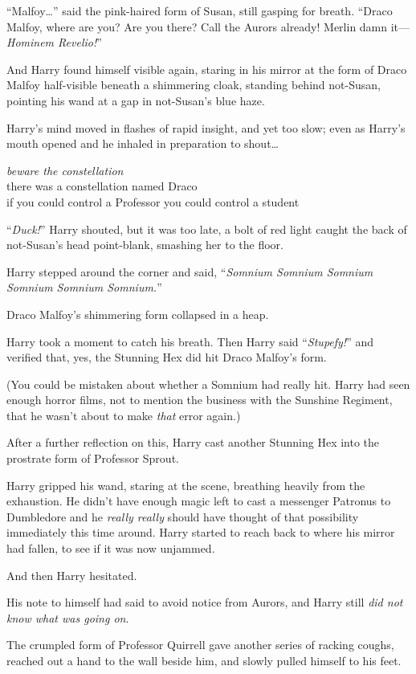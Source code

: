 “Malfoy…” said the pink-haired form of Susan, still gasping for breath. “Draco Malfoy, where are you? Are you there? Call the Aurors already! Merlin damn it—\emph{Hominem Revelio!}”

And Harry found himself visible again, staring in his mirror at the form of Draco Malfoy half-visible beneath a shimmering cloak, standing behind not-Susan, pointing his wand at a gap in not-Susan’s blue haze.

Harry’s mind moved in flashes of rapid insight, and yet too slow; even as Harry’s mouth opened and he inhaled in preparation to shout…

\noindent{}\emph{beware the constellation}\\
there was a constellation named Draco\\
if you could control a Professor you could control a student

“\emph{Duck!}” Harry shouted, but it was too late, a bolt of red light caught the back of not-Susan’s head point-blank, smashing her to the floor.

Harry stepped around the corner and said, “\emph{Somnium Somnium Somnium Somnium Somnium Somnium.}”

Draco Malfoy’s shimmering form collapsed in a heap.

Harry took a moment to catch his breath. Then Harry said “\emph{Stupefy!}” and verified that, yes, the Stunning Hex did hit Draco Malfoy’s form.

(You could be mistaken about whether a Somnium had really hit. Harry had seen enough horror films, not to mention the business with the Sunshine Regiment, that he wasn’t about to make \emph{that} error again.)

After a further reflection on this, Harry cast another Stunning Hex into the prostrate form of Professor Sprout.

Harry gripped his wand, staring at the scene, breathing heavily from the exhaustion. He didn’t have enough magic left to cast a messenger Patronus to Dumbledore and he \emph{really really} should have thought of that possibility immediately this time around. Harry started to reach back to where his mirror had fallen, to see if it was now unjammed.

And then Harry hesitated.

His note to himself had said to avoid notice from Aurors, and Harry still \emph{did not know what was going on}.

The crumpled form of Professor Quirrell gave another series of racking coughs, reached out a hand to the wall beside him, and slowly pulled himself to his feet.

